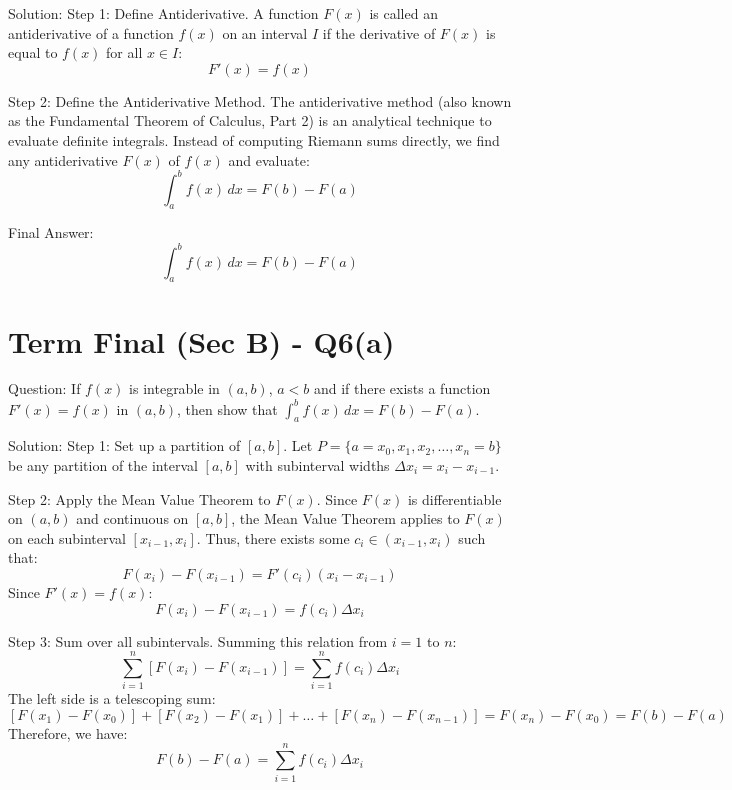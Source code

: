 \documentclass{article}
\begin{document}
Solution:
Step 1: Define Antiderivative.
A function $F(x)$ is called an antiderivative of a function $f(x)$ on an interval $I$ if the derivative of $F(x)$ is equal to $f(x)$ for all $x \in I$:
\[
F'(x) = f(x)
\]

Step 2: Define the Antiderivative Method.
The antiderivative method (also known as the Fundamental Theorem of Calculus, Part 2) is an analytical technique to evaluate definite integrals. Instead of computing Riemann sums directly, we find any antiderivative $F(x)$ of $f(x)$ and evaluate:
\[
\int_a^b f(x) \, dx = F(b) - F(a)
\]

Final Answer:
\[
\boxed{\int_a^b f(x) \, dx = F(b) - F(a)}
\]

\section*{Term Final (Sec B) - Q6(a)}
Question:
If $f(x)$ is integrable in $(a, b)$, $a < b$ and if there exists a function $F'(x) = f(x)$ in $(a, b)$, then show that $\int_a^b f(x) \, dx = F(b) - F(a)$.

Solution:
Step 1: Set up a partition of $[a, b]$.
Let $P = \{a = x_0, x_1, x_2, \dots, x_n = b\}$ be any partition of the interval $[a, b]$ with subinterval widths $\Delta x_i = x_i - x_{i-1}$.

Step 2: Apply the Mean Value Theorem to $F(x)$.
Since $F(x)$ is differentiable on $(a, b)$ and continuous on $[a, b]$, the Mean Value Theorem applies to $F(x)$ on each subinterval $[x_{i-1}, x_i]$. Thus, there exists some $c_i \in (x_{i-1}, x_i)$ such that:
\[
F(x_i) - F(x_{i-1}) = F'(c_i)(x_i - x_{i-1})
\]
Since $F'(x) = f(x)$:
\[
F(x_i) - F(x_{i-1}) = f(c_i) \Delta x_i
\]

Step 3: Sum over all subintervals.
Summing this relation from $i = 1$ to $n$:
\[
\sum_{i=1}^n [F(x_i) - F(x_{i-1})] = \sum_{i=1}^n f(c_i) \Delta x_i
\]
The left side is a telescoping sum:
\[
[F(x_1) - F(x_0)] + [F(x_2) - F(x_1)] + \dots + [F(x_n) - F(x_{n-1})] = F(x_n) - F(x_0) = F(b) - F(a)
\]
Therefore, we have:
\[
F(b) - F(a) = \sum_{i=1}^n f(c_i) \Delta x_i
\]
\end{document}
